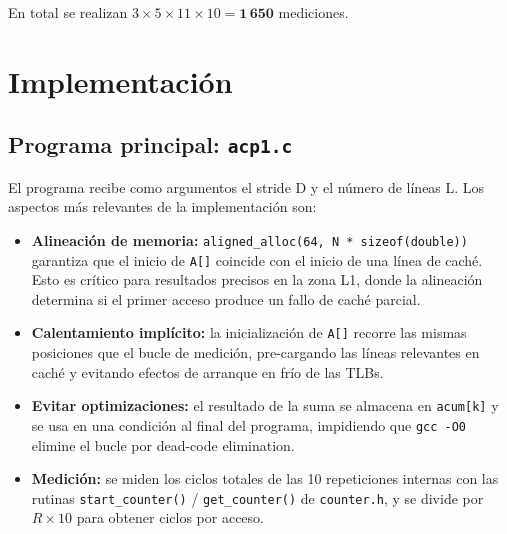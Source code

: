 \documentclass[12pt,a4paper]{article}
\begin{document}
En total se realizan $3 \times 5 \times 11 \times 10 = \mathbf{1\,650}$ mediciones.

\section{Implementación}

\subsection{Programa principal: \texttt{acp1.c}}

El programa recibe como argumentos el stride D y el número de líneas L. Los aspectos más relevantes de la implementación son:

\begin{itemize}[leftmargin=1.5em]
  \item \textbf{Alineación de memoria:} \texttt{aligned\_alloc(64, N * sizeof(double))} garantiza que el inicio de \texttt{A[]} coincide con el inicio de una línea de caché. Esto es crítico para resultados precisos en la zona L1, donde la alineación determina si el primer acceso produce un fallo de caché parcial.
  \item \textbf{Calentamiento implícito:} la inicialización de \texttt{A[]} recorre las mismas posiciones que el bucle de medición, pre-cargando las líneas relevantes en caché y evitando efectos de arranque en frío de las TLBs.
  \item \textbf{Evitar optimizaciones:} el resultado de la suma se almacena en \texttt{acum[k]} y se usa en una condición al final del programa, impidiendo que \texttt{gcc -O0} elimine el bucle por dead-code elimination.
  \item \textbf{Medición:} se miden los ciclos totales de las 10 repeticiones internas con las rutinas \texttt{start\_counter()} / \texttt{get\_counter()} de \texttt{counter.h}, y se divide por $R \times 10$ para obtener ciclos por acceso.
\end{itemize}
\end{document}
